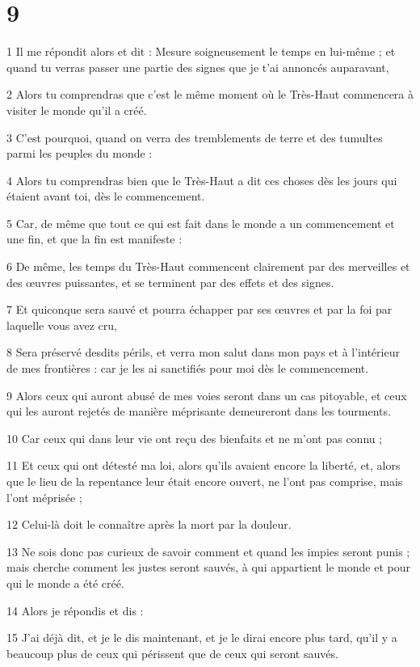 \chapter{9}

\par 1 Il me répondit alors et dit : Mesure soigneusement le temps en lui-même ; et quand tu verras passer une partie des signes que je t'ai annoncés auparavant,
\par 2 Alors tu comprendras que c'est le même moment où le Très-Haut commencera à visiter le monde qu'il a créé.
\par 3 C'est pourquoi, quand on verra des tremblements de terre et des tumultes parmi les peuples du monde :
\par 4 Alors tu comprendras bien que le Très-Haut a dit ces choses dès les jours qui étaient avant toi, dès le commencement.
\par 5 Car, de même que tout ce qui est fait dans le monde a un commencement et une fin, et que la fin est manifeste :
\par 6 De même, les temps du Très-Haut commencent clairement par des merveilles et des œuvres puissantes, et se terminent par des effets et des signes.
\par 7 Et quiconque sera sauvé et pourra échapper par ses œuvres et par la foi par laquelle vous avez cru,
\par 8 Sera préservé desdits périls, et verra mon salut dans mon pays et à l'intérieur de mes frontières : car je les ai sanctifiés pour moi dès le commencement.
\par 9 Alors ceux qui auront abusé de mes voies seront dans un cas pitoyable, et ceux qui les auront rejetés de manière méprisante demeureront dans les tourments.
\par 10 Car ceux qui dans leur vie ont reçu des bienfaits et ne m'ont pas connu ;
\par 11 Et ceux qui ont détesté ma loi, alors qu'ils avaient encore la liberté, et, alors que le lieu de la repentance leur était encore ouvert, ne l'ont pas comprise, mais l'ont méprisée ;
\par 12 Celui-là doit le connaître après la mort par la douleur.
\par 13 Ne sois donc pas curieux de savoir comment et quand les impies seront punis ; mais cherche comment les justes seront sauvés, à qui appartient le monde et pour qui le monde a été créé.
\par 14 Alors je répondis et dis :
\par 15 J'ai déjà dit, et je le dis maintenant, et je le dirai encore plus tard, qu'il y a beaucoup plus de ceux qui périssent que de ceux qui seront sauvés.
